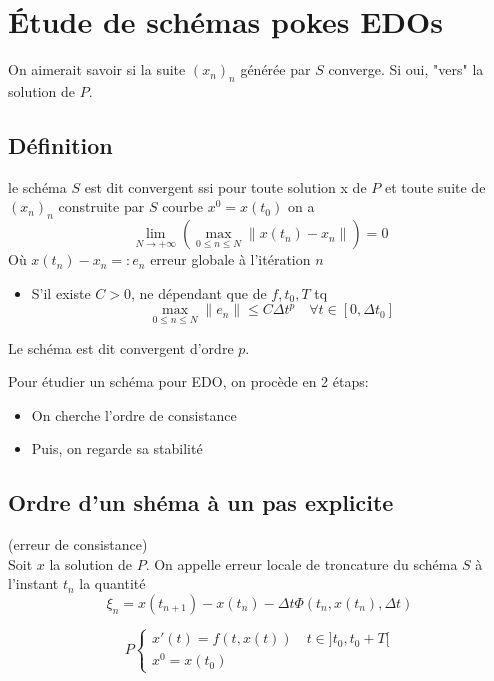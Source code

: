 \section{Étude de schémas pokes EDOs}
On aimerait savoir si la suite $(x_n)_{n}$ générée par $S$ converge. Si oui,  "vers" la solution de $P$.
\subsection{Définition}
\begin{definition}
    le schéma $S$ est dit convergent ssi pour toute solution x de  $P$ et toute suite de  $(x_n)_n$ construite par  $S$ courbe  $x^0 = x(t_0)$ on a
    \[
    \lim_{N \to +\infty} \left( \max_{0 \le n \le N} \|x(t_n) - x_n \| \right)  = 0
    \] 
    Où $x(t_n) - x_n =: e_n$ erreur globale à l'itération  $n$
    \begin{itemize}
        \item S'il existe $C > 0$, ne dépendant que de  $f, t_0, T$ tq  
            \[
                \max_{0 \le n \le N} \|e_n\| \le  C \Delta t^p \quad \forall t \in [0, \Delta t_0]
            \] 
    \end{itemize}
    Le schéma est dit convergent d'ordre $p$.
\end{definition}
\begin{remark}
   Pour étudier un schéma pour EDO, on procède en 2 étaps:
   \begin{itemize}
       \item On cherche l'ordre de consistance
       \item Puis, on regarde sa stabilité
   \end{itemize}
\end{remark}
\subsection{Ordre d'un shéma à un pas explicite}
\begin{definition}
    (erreur de consistance)\\
    Soit $x$ la solution de  $P$. On appelle erreur locale de troncature du schéma  $S$ à l'instant  $t_n$ la quantité 
    \[
        \xi_n = x(t_{n+1}) - x(t_n) - \Delta t \Phi (t_n, x(t_n), \Delta t)
    \] 
\end{definition}
\[
P \begin{cases}
    x'(t) = f(t, x(t)) \quad t \in ]t_0, t_0 + T[\\
    x^0 = x(t_0)
\end{cases}
\] 

